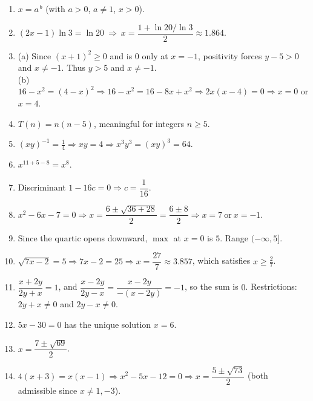 \documentclass{article}
\begin{document}
\begin{enumerate}[label=\textbf{\arabic*.}, leftmargin=*, itemsep=0.45em]
\item $x=a^{\,b}$ (with $a>0$, $a\ne1$, $x>0$).

\item $(2x-1)\ln 3=\ln 20\ \Rightarrow\ x=\dfrac{1+\ln 20/\ln 3}{2}\approx 1.864$.

\item (a) Since $(x+1)^2\ge0$ and is $0$ only at $x=-1$, positivity forces $y-5>0$ and $x\ne -1$. Thus $y>5$ and $x\ne -1$.\\
(b) $16-x^2=(4-x)^2\Rightarrow 16-x^2=16-8x+x^2\Rightarrow 2x(x-4)=0\Rightarrow x=0$ or $x=4$.

\item $T(n)=n(n-5)$, meaningful for integers $n\ge 5$.

\item $(xy)^{-1}=\tfrac14\Rightarrow xy=4\Rightarrow x^3y^3=(xy)^3=64$.

\item $x^{11+5-8}=x^8$.

\item Discriminant $1-16c=0\Rightarrow c=\dfrac{1}{16}$.

\item $x^2-6x-7=0\Rightarrow x=\dfrac{6\pm\sqrt{36+28}}{2}=\dfrac{6\pm 8}{2}\Rightarrow x=7\ \text{or}\ x=-1$.

\item Since the quartic opens downward, $\max$ at $x=0$ is $5$. Range $(-\infty,5]$.

\item $\sqrt{7x-2}=5\Rightarrow 7x-2=25\Rightarrow x=\dfrac{27}{7}\approx 3.857$, which satisfies $x\ge \tfrac{2}{7}$.

\item $\dfrac{x+2y}{2y+x}=1$, and $\dfrac{x-2y}{2y-x}=\dfrac{x-2y}{-(x-2y)}=-1$, so the sum is $0$. Restrictions: $2y+x\ne0$ and $2y-x\ne0$.

\item $5x-30=0$ has the unique solution $x=6$.

\item $x=\dfrac{7\pm\sqrt{69}}{2}$.

\item $4(x+3)=x(x-1)\Rightarrow x^2-5x-12=0\Rightarrow x=\dfrac{5\pm\sqrt{73}}{2}$ (both admissible since $x\ne1,-3$).

\end{enumerate}
\end{document}
